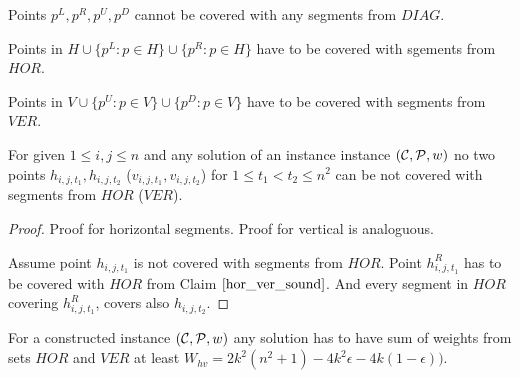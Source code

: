 \begin{claim}
\label{guards}
Points $p^{L}, p^R, p^U, p^D$ cannot be covered with
any segments from $DIAG$.
\end{claim}


\begin{claim}
\label{hor_ver_sound}
Points in $H \cup \{p^L : p \in H\} \cup \{p^R : p \in H\}$
have to be covered with sgements from $HOR$.

Points in $V \cup \{p^U : p \in V\} \cup \{p^D : p \in V\} $
have to be covered with segments from $VER$.
\end{claim}


\begin{claim}
\label{one_diag_in_square}
For given $1 \le i, j \le n$
and any solution of an instance instance $(\mathcal{C}, \mathcal{P}, w)$
no two points $h_{i, j, t_1}, h_{i, j, t_2}$
($v_{i, j, t_1}, v_{i, j, t_2}$)
for $1 \le t_1 < t_2 \le n^2$
can be not covered with segments from $HOR$ ($VER$).
\end{claim}

\begin{proof}
Proof for horizontal segments. Proof for vertical is analoguous.

Assume point $h_{i, j, t_1}$ is not covered with
segments from $HOR$.
Point $h^R_{i, j, t_1}$ has to be covered with $HOR$
from Claim $\ref{hor_ver_sound}$.
And every segment in $HOR$ covering $h^R_{i, j, t_1}$,
covers also $h_{i, j, t_2}$.
\end{proof}

\begin{lemma}
\label{vertical_horizontal_sum}
For a constructed instance $(\mathcal{C}, \mathcal{P}, w)$
any solution has to have sum of weights from sets $HOR$ and $VER$ at least
$W_{hv} = 2k^2(n^2+1) -4k^2\epsilon -4k(1-\epsilon))$.
\end{lemma}

